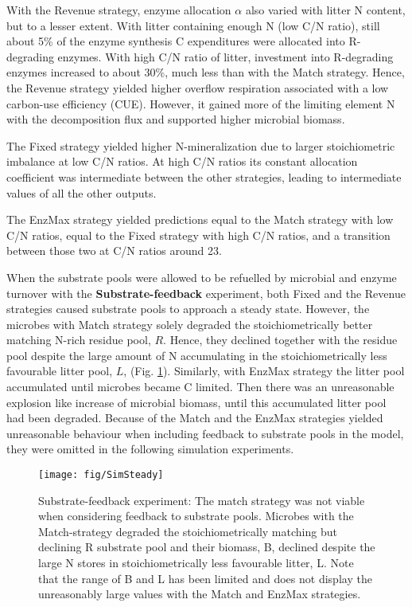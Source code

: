 With the Revenue strategy, enzyme allocation $\alpha$ also varied with litter N
content, but to a lesser extent.
With litter containing enough N (low C/N ratio), still about 5\% of the enzyme
synthesis C expenditures were allocated into R-degrading enzymes. 
With high C/N ratio of litter, investment into R-degrading enzymes increased to
about 30\%, much less than with the Match strategy. Hence, the Revenue strategy
yielded higher overflow respiration associated with a low carbon-use
efficiency (CUE). However, it gained more of the limiting element N with the
decomposition flux and supported higher microbial biomass. 

The Fixed strategy yielded higher N-mineralization due to larger stoichiometric
imbalance at low C/N ratios.
At high C/N ratios its constant allocation coefficient was intermediate between
the other strategies, leading to intermediate values of all the other outputs.

The EnzMax strategy yielded predictions equal to the Match strategy with low C/N
ratios, equal to the Fixed strategy with high C/N ratios, and a transition
between those two at C/N ratios around 23.


When the substrate pools were allowed to be refuelled by microbial and enzyme
turnover with the \textbf{Substrate-feedback} experiment, both Fixed and the
Revenue strategies caused substrate pools to approach a steady state.
However, the microbes with Match strategy solely degraded the stoichiometrically
better matching N-rich residue pool, $R$. Hence, they declined together with the
residue pool despite the large amount of N accumulating in the
stoichiometrically less favourable litter pool, $L$, (Fig. \ref{fig:SimSteady}).
Similarly, with EnzMax strategy the litter pool accumulated until microbes
became C limited. Then there was an unreasonable explosion like increase of
microbial biomass, until this accumulated litter pool had been degraded.
Because of the Match and the EnzMax strategies yielded unreasonable behaviour
when including feedback to substrate pools in the model, they were omitted in
the following simulation experiments.

\begin{figure}[t]
\vspace*{2mm}
\begin{center} 
\texttt{[image: fig/SimSteady]} 
\end{center}
\caption{
Substrate-feedback experiment: The match strategy was not viable when
considering feedback to substrate pools. Microbes
with the Match-strategy degraded the stoichiometrically matching but declining R
substrate pool and their biomass, B, declined despite the large N stores in
stoichiometrically less favourable litter, L. Note that the range of B and L has
been limited and does not display the unreasonably large values with the Match
and EnzMax strategies.
\label{fig:SimSteady}} 
\end{figure}

